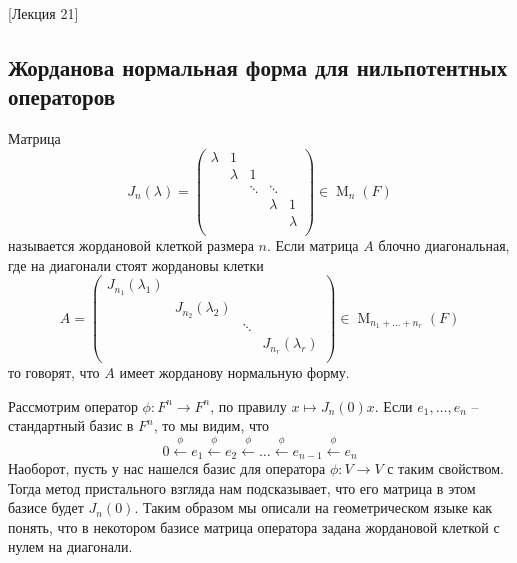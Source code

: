 [Лекция 21]


\subsection{Жорданова нормальная форма для нильпотентных операторов}

\begin{definition}
\label{def::JNF}
Матрица 
\[
J_n(\lambda) = 
\begin{pmatrix}
{\lambda}&{1}&{}&{}&{}\\
{}&{\lambda}&{1}&{}&{}\\
{}&{}&{\ddots}&{\ddots}&{}\\
{}&{}&{}&{\lambda}&{1}\\
{}&{}&{}&{}&{\lambda}\\
\end{pmatrix}
\in \operatorname{M}_n(F)
\]
называется жордановой клеткой размера $n$.
Если матрица $A$ блочно диагональная, где на диагонали стоят жордановы клетки
\[
A = 
\begin{pmatrix}
{J_{n_1}(\lambda_1)}&{}&{}&{}\\
{}&{J_{n_2}(\lambda_2)}&{}&{}\\
{}&{}&{\ddots}&{}\\
{}&{}&{}&{J_{n_r}(\lambda_r)}\\
\end{pmatrix}
\in \operatorname{M}_{n_1 + \ldots + n_r}(F)
\]
то говорят, что $A$ имеет жорданову нормальную форму.
\end{definition}

Рассмотрим оператор $\phi\colon F^n \to F^n$, по правилу $x\mapsto J_n(0)x$.
Если $e_1, \ldots ,e_n$ -- стандартный базис в $F^n$, то мы видим, что 
\[
0\stackrel{\phi}{\longleftarrow}e_1\stackrel{\phi}{\longleftarrow}e_2 \stackrel{\phi}{\longleftarrow}\ldots\stackrel{\phi}{\longleftarrow}e_{n-1}\stackrel{\phi}{\longleftarrow}e_n
\]
Наоборот, пусть у нас нашелся базис для оператора $\phi\colon V\to V$ с таким свойством.
Тогда метод пристального взгляда нам подсказывает, что его матрица в этом базисе будет $J_n(0)$.
Таким образом мы описали на геометрическом языке как понять, что в некотором базисе матрица оператора задана жордановой клеткой с нулем на диагонали.

